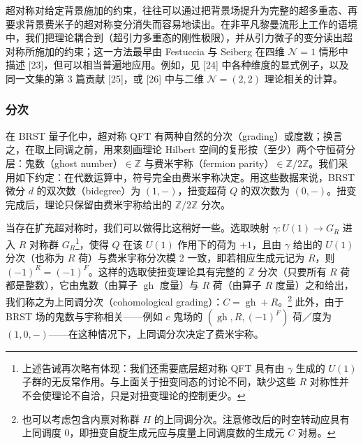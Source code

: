 超对称对给定背景施加的约束，往往可以通过把背景场提升为完整的超多重态、再要求背景费米子的超对称变分消失而容易地读出。在非平凡黎曼流形上工作的语境中，我们把理论耦合到（超引力多重态的刚性极限），并从引力微子的变分读出超对称所施加的约束；这一方法最早由 Festuccia 与 Seiberg 在四维 $\mathcal{N}=1$ 情形中描述 [23]，但可以相当普遍地应用。例如，见 [24] 中各种维度的显式例子，以及同一文集的第 3 篇贡献 [25]，或 [26] 中与二维 $\mathcal{N}=(2,2)$ 理论相关的计算。


\subsubsection{分次}

在 BRST 量子化中，超对称 QFT 有两种自然的分次（grading）或度数；换言之，在取上同调之前，用来刻画理论 Hilbert 空间的复形按（至少）两个守恒荷分层：鬼数（ghost number）$\in\mathbb{Z}$ 与费米宇称（fermion parity）$\in\mathbb{Z}/2\mathbb{Z}$。我们采用如下约定：在代数运算中，符号完全由费米宇称决定。用这些数据来说，BRST 微分 $d$ 的双次数（bidegree）为 $(1,-)$，扭变超荷 $Q$ 的双次数为 $(0,-)$。扭变完成后，理论只保留由费米宇称给出的 $\mathbb{Z}/2\mathbb{Z}$ 分次。

当存在扩充超对称时，我们可以做得比这稍好一些。选取映射 $\gamma:U(1)\to G_R$ 进入 $R$ 对称群 $G_R$\footnote{上述告诫再次略有体现：我们还需要底层超对称 QFT 具有由 $\gamma$ 生成的 $U(1)$ 子群的无反常作用。与上面关于扭变同态的讨论不同，缺少这些 $R$ 对称性并不会使理论不自洽，只是对扭变理论的控制更少。}，使得 $Q$ 在该 $U(1)$ 作用下的荷为 $+1$，且由 $\gamma$ 给出的 $U(1)$ 分次（也称为 $R$ 荷）与费米宇称分次模 2 一致，即若相应生成元记为 $R$，则 $(-1)^R=(-1)^F$。这样的选取使扭变理论具有完整的 $\mathbb{Z}$ 分次（只要所有 $R$ 荷都是整数），它由鬼数（由算子 $\operatorname{gh}$ 度量）与 $R$ 荷（由算子 $R$ 度量）之和给出，我们称之为上同调分次（cohomological grading）：$C=\operatorname{gh}+R$。\footnote{也可以考虑包含内禀对称群 $H$ 的上同调分次。注意修改后的时空转动应具有上同调度 0，即扭变自旋生成元应与度量上同调度数的生成元 $C$ 对易。} 此外，由于 BRST 场的鬼数与宇称相关——例如 $c$ 鬼场的 $(\operatorname{gh},R,(-1)^F)$ 荷／度为 $(1,0,-)$——在这种情况下，上同调分次决定了费米宇称。

